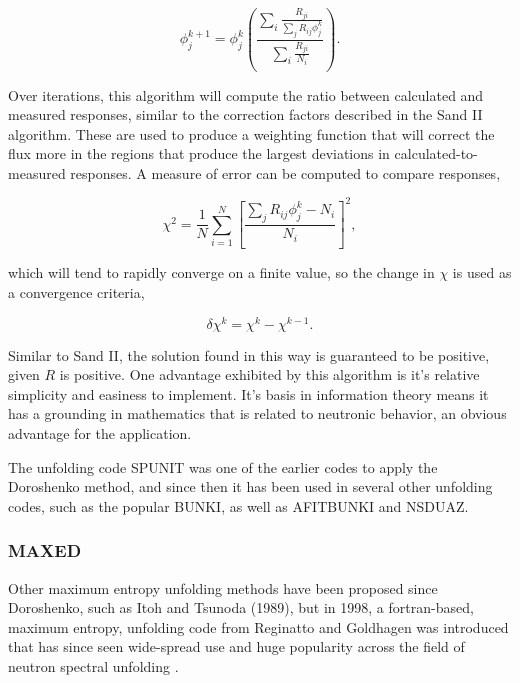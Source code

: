 \begin{equation}
\label{eqn:doroshenko}
\phi_j^{k + 1} = \phi_j^{k} (\frac{\sum_i \frac{R_{ji}}{\sum_j R_{ij} \phi_j^k}}{\sum_i \frac{R_{ji}}{N_i}}) .
\end{equation}

Over iterations, this algorithm will compute the ratio between calculated and measured responses, similar to the correction factors described in the Sand II algorithm.
These are used to produce a weighting function that will correct the flux more in the regions that produce the largest deviations in calculated-to-measured responses.
A measure of error can be computed to compare responses,

\begin{equation}
\label{eqn:doroshenko-error}
\chi^2 = \frac{1}{N} \sum_{i=1}^N [\frac{\sum_j R_{ij} \phi_j^k - N_i}{N_i}]^2 ,
\end{equation}

which will tend to rapidly converge on a finite value, so the change in $\chi$ is used as a convergence criteria,

\begin{equation}
\label{eqn:doroshenko-error-delta}
\delta \chi^k = \chi^k - \chi^{k-1} .
\end{equation}

Similar to Sand II, the solution found in this way is guaranteed to be positive, given $R$ is positive.
One advantage exhibited by this algorithm is it's relative simplicity and easiness to implement.
It's basis in information theory means it has a grounding in mathematics that is related to neutronic behavior, an obvious advantage for the application.

The unfolding code SPUNIT was one of the earlier codes to apply the Doroshenko method, and since then it has been used in several other unfolding codes, such as the popular BUNKI, as well as AFITBUNKI and NSDUAZ.




\subsubsection{MAXED}

Other maximum entropy unfolding methods have been proposed since Doroshenko, such as Itoh and Tsunoda (1989), but in 1998, a fortran-based, maximum entropy, unfolding code from Reginatto and Goldhagen was introduced that has since seen wide-spread use and huge popularity across the field of neutron spectral unfolding \cite{reginatto1999maxed}.


